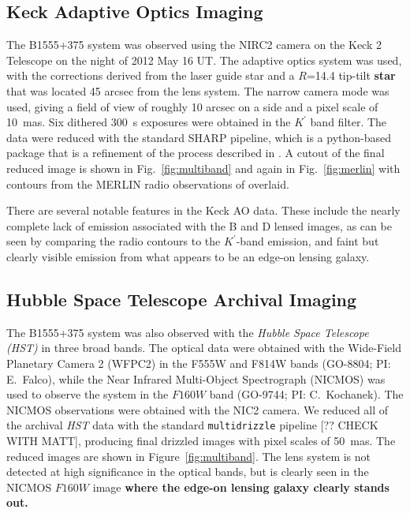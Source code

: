 \documentclass[useAMS,usenatbib]{mn2e}
\begin{document}
\subsection{Keck Adaptive Optics Imaging}

The B1555+375 system was observed using the NIRC2 camera on the Keck 2
Telescope on the night of 2012 May 16 UT.  The adaptive optics system
was used, with the corrections derived from the laser guide star and a
$R$=14.4 tip-tilt \textbf{star} that was located 45 arcsec from the lens
system.  The narrow camera mode was used, giving a field of view
of roughly 10 arcsec on a side and a pixel scale of 10~mas.
Six dithered 300~s exposures were obtained in the $K^{\prime}$ band filter.  The
data were reduced with the standard SHARP pipeline, which is a
python-based package that is a refinement of the process described in
\citet{Auger_EELS1}.  A cutout of the final reduced image is shown in
Fig.~\ref{fig:multiband} and again in Fig.~\ref{fig:merlin} with
contours from the MERLIN radio observations of \citet{Marlow99}
overlaid.  

There are several notable features in the Keck AO data.
These include the nearly complete lack of emission associated with the
B and D lensed images, as can be seen by comparing the radio contours
to the $K^\prime$-band emission, and faint but clearly visible
emission from what appears to be an edge-on lensing galaxy.

\subsection{Hubble Space Telescope Archival Imaging}

The B1555+375 system was also observed with the \textit{Hubble Space Telescope
(\textit{HST})} in three broad bands.  The optical data were obtained with the
Wide-Field Planetary Camera 2 (WFPC2) in the F555W and F814W bands
(GO-8804; PI: E.\ Falco), while the Near Infrared Multi-Object
Spectrograph (NICMOS) was used to observe the system in the $F160W$
band (GO-9744; PI: C.\ Kochanek).  The NICMOS observations were
obtained with the NIC2 camera.  We reduced all of the archival \textit{HST}
data with the standard {\tt multidrizzle} pipeline [?? CHECK WITH
  MATT], producing final drizzled images with pixel scales of 50~mas.
The reduced images are shown in Figure~\ref{fig:multiband}.  The lens
system is not detected at high significance in the optical bands, but
is clearly seen in the NICMOS $F160W$ image \textbf{where the edge-on lensing
galaxy clearly stands out.}
\end{document}
